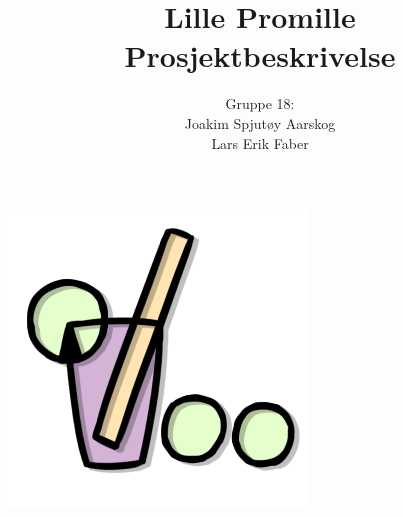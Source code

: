 \documentclass[12pt]{article}
\begin{document}
\title{%
    Lille Promille\\
    \large Prosjektbeskrivelse}
\author{
    Gruppe 18:\\
    Joakim Spjutøy Aarskog\\
    Lars Erik Faber}
\date{}
\maketitle
\begin{center}
    \includegraphics[scale=3]{images/lille_promille_logo.png}    
\end{center}
\thispagestyle{empty}
\newpage
\tableofcontents
\thispagestyle{empty}
\newpage
\setcounter{page}{1}






\end{document}
